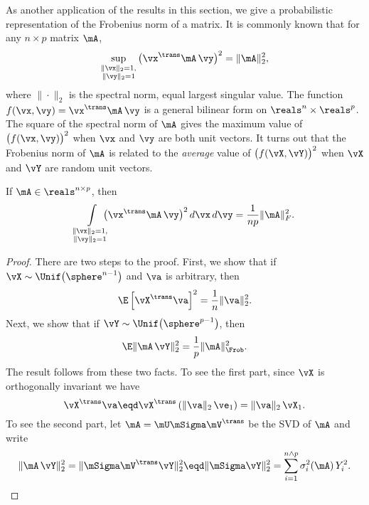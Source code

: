 As another application of the results in this section, we give a probabilistic
representation of the Frobenius norm of a matrix.  It is commonly known that 
for any 
$n \times p$ matrix $\mA$, 
\[
    \sup_{ \substack{
                \| \vx \|_2 = 1, \\
                \| \vy \|_2 = 1 } }
        \big( \vx^\trans \mA \, \vy \big)^2
        =
        \| \mA \|_2^2,
\]
where $\| \cdot \|_2$ is the spectral norm, equal largest singular value.  The 
function
\(
    f( \vx, \vy ) = \vx^\trans \mA \, \vy
\)
is a general bilinear form on $\reals^n \times \reals^p$.  The square of the
spectral norm of $\mA$ gives the maximum value of $\big( f(\vx, \vy) \big)^2$
when $\vx$ and $\vy$ are both unit vectors.
It turns out that the Frobenius norm of $\mA$ is related to the
\emph{average} value of $\big( f(\vX, \vY) \big)^2$ when $\vX$ and $\vY$ are
random unit vectors.

\begin{proposition}
    If $\mA \in \reals^{n \times p}$, then
    \[
        \int\limits_{ \substack{
                          \| \vx \|_2 = 1, \\
                          \| \vy \|_2 = 1 } }
            \!\!\!\!\!
            \big(
                \vx^\trans \mA \, \vy
            \big)^2
            \, d\vx \, d\vy
        =
        \frac{1}{np} \| \mA \|_F^2.
    \]
\end{proposition}
\begin{proof}
    There are two steps to the proof.  First, we show that if 
    \(
        \vX \sim \Unif\big( \sphere^{n-1} \big)
    \)
    and $\va$ is arbitrary, then
    \[
        \E \left[ \vX^\trans \va \right]^2 = \frac{1}{n} \| \va \|_2^2.
    \]
    Next, we show that if $\vY \sim \Unif\big( \sphere^{p-1} \big)$, then
    \[
        \E \| \mA \, \vY \|_2^2 = \frac{1}{p} \| \mA \|_\Frob^2.
    \]
    The result follows from these two facts.
    To see the first part, since $\vX$ is orthogonally invariant we have
    \[
        \vX^\trans \va
            \eqd 
                \vX^\trans \left( \| \va \|_2 \, \ve_1 \right)
            = \| \va \|_2 \, \vX_1.
    \]
    To see the second part, let $\mA = \mU \mSigma \mV^\trans$ be the
    SVD of $\mA$ and write
    \[
        \| \mA \, \vY \|_2^2
            =
                \| \mSigma \mV^\trans \vY \|_2^2
            \eqd
                \| \mSigma \vY \|_2^2
            =
                \sum_{i=1}^{n \wedge p} \sigma_i^2( \mA ) \, Y_i^2.
        \qedhere
    \]
\end{proof}
